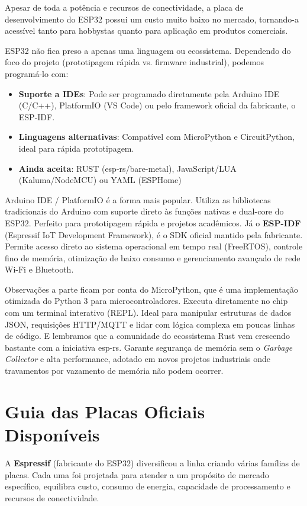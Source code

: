 \documentclass[a4paper,11pt]{article}
\begin{document}
Apesar de toda a potência e recursos de conectividade, a placa de desenvolvimento do ESP32 possui um custo muito baixo no mercado, tornando-a acessível tanto para hobbystas quanto para aplicação em produtos comerciais.

ESP32 não fica preso a apenas uma linguagem ou ecossistema. Dependendo do foco do projeto (prototipagem rápida vs. firmware industrial), podemos programá-lo com: \vspace{-1em}
\begin{itemize}
	\item \textbf{Suporte a IDEs}: Pode ser programado diretamente pela Arduino IDE (C/C++), PlatformIO (VS Code) ou pelo framework oficial da fabricante, o ESP-IDF.
	\item \textbf{Linguagens alternativas}: Compatível com MicroPython e CircuitPython, ideal para rápida prototipagem.
	\item \textbf{Ainda aceita}: RUST (esp-rs/bare-metal), JavaScript/LUA (Kaluma/NodeMCU) ou YAML (ESPHome)
\end{itemize}

Arduino IDE / PlatformIO é a forma mais popular. Utiliza as bibliotecas tradicionais do Arduino com suporte direto às funções nativas e dual-core do ESP32. Perfeito para prototipagem rápida e projetos acadêmicos. Já o \textbf{ESP-IDF} (Espressif IoT Development Framework), é o SDK oficial mantido pela fabricante. Permite acesso direto ao sistema operacional em tempo real (FreeRTOS), controle fino de memória, otimização de baixo consumo e gerenciamento avançado de rede Wi-Fi e Bluetooth.

Observações a parte ficam por conta do MicroPython, que é uma implementação otimizada do Python 3 para microcontroladores. Executa diretamente no chip com um terminal interativo (REPL). Ideal para manipular estruturas de dados JSON, requisições HTTP/MQTT e lidar com lógica complexa em poucas linhas de código. E lembramos que a comunidade do ecossistema Rust vem crescendo bastante com a iniciativa esp-rs. Garante segurança de memória sem o \textit{Garbage Collector} e alta performance, adotado em novos projetos industriais onde travamentos por vazamento de memória não podem ocorrer.

\section{Guia das Placas Oficiais Disponíveis}
A \textbf{Espressif} (fabricante do ESP32) diversificou a linha criando várias famílias de placas. Cada uma foi projetada para atender a um propósito de mercado específico, equilibra custo, consumo de energia, capacidade de processamento e recursos de conectividade.
\end{document}
